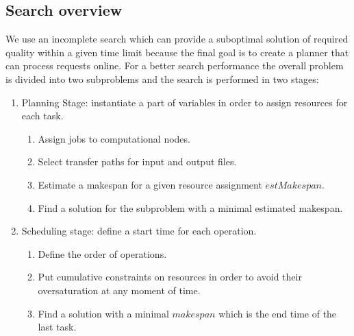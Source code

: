 \documentclass[english]{ddny}
\begin{document}
\subsection{Search overview}
We use an incomplete search which can provide a suboptimal solution of required quality within a given time limit because the final goal is to create a planner that can process requests online.
For a better search performance the overall problem is divided into two subproblems and the search is performed in two stages: 
\begin{enumerate}
\item Planning Stage: instantiate a part of variables in order to assign resources for each task.     
	\begin{enumerate}
	\item Assign jobs to computational nodes. 
	\item Select transfer paths for input and output files. 
	\item Estimate a makespan for a given resource assignment $estMakespan$.
	\item Find a solution for the subproblem with a minimal estimated makespan. 
	\end{enumerate}
\item Scheduling stage: define a start time for each operation. 
	\begin{enumerate}
	\item Define the order of operations. 
	\item Put cumulative constraints on resources in order to avoid their oversaturation at any moment of time.
	\item Find a solution with a minimal $makespan$ which is the end time of the last task. 
	\end{enumerate}
\end{enumerate}
\end{document}
